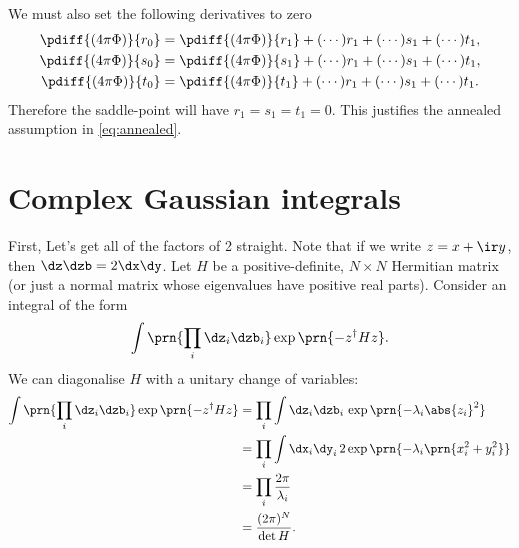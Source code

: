\documentclass[12pt]{article}
\newcommand{\dg}{^\dagger}
\begin{document}
We must also set the following derivatives to zero
%
\begin{equation}\label{eq:phidiff0}
\begin{aligned}
  \pdiff{(4\pi\Phi)}{r_0} &= \pdiff{(4\pi\Phi)}{r_1} +(\cdots)r_1+(\cdots)s_1+(\cdots)t_1,  \\
  \pdiff{(4\pi\Phi)}{s_0} &= \pdiff{(4\pi\Phi)}{s_1} +(\cdots)r_1+(\cdots)s_1+(\cdots)t_1,  \\
  \pdiff{(4\pi\Phi)}{t_0} &= \pdiff{(4\pi\Phi)}{t_1} +(\cdots)r_1+(\cdots)s_1+(\cdots)t_1.
\end{aligned}
\end{equation}
%
Therefore the saddle-point will have $r_1=s_1=t_1=0$.
This justifies the annealed assumption in \eqref{eq:annealed}.





\startappendices

\section{Complex Gaussian integrals}\label{sec:compgauss}

First, Let's get all of the factors of 2 straight.
Note that if we write $z=x+\ir y$, then $\dz\dzb = 2\dx\dy$.
Let $H$ be a positive-definite, $N\times N$ Hermitian matrix
(or just a normal matrix whose eigenvalues have positive real parts).
Consider an integral  of the form
%
\begin{equation*}
  \int \prn{\prod_i\dz_i\dzb_i} \exp\prn{-z\dg H z}.
\end{equation*}
%
We can diagonalise $H$ with a unitary change of variables:
%
\begin{equation}\label{eq:compgausint}
\begin{aligned}
  \int \prn{\prod_i\dz_i\dzb_i} \exp\prn{-z\dg H z} &=
    \prod_i \int \dz_i\dzb_i\, \exp\prn{-\lambda_i \abs{z_i}^2} \\
    &= \prod_i \int \dx_i\dy_i\, 2\exp\prn{-\lambda_i \prn{x_i^2+y_i^2}} \\
    &= \prod_i \frac{2\pi}{\lambda_i}\\
    &= \frac{(2\pi)^N}{\det H}.
\end{aligned}
\end{equation}
%
\end{document}
